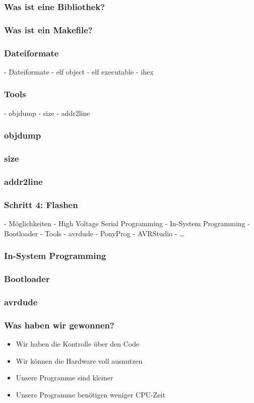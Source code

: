 \documentclass{beamer}
\begin{document}
\begin{frame}
\frametitle{Was ist eine Bibliothek?}
\end{frame}

\begin{frame}
\frametitle{Was ist ein Makefile?}
\end{frame}

\begin{frame}
\frametitle{Dateiformate}
- Dateiformate
    - elf object
    - elf executable
    - ihex
\end{frame}

\begin{frame}
\frametitle{Tools}
    - objdump
    - size
    - addr2line
\end{frame}

\begin{frame}
\frametitle{objdump}
\end{frame}

\begin{frame}
\frametitle{size}
\end{frame}

\begin{frame}
\frametitle{addr2line}
\end{frame}

\begin{frame}
\frametitle{Schritt 4: Flashen}
- Möglichkeiten
    - High Voltage Serial Programming 
    - In-System Programming
    - Bootloader
- Tools
  - avrdude
  - PonyProg
  - AVRStudio
  - …
\end{frame}

\begin{frame}
\frametitle{In-System Programming}
\end{frame}

\begin{frame}
\frametitle{Bootloader}
\end{frame}

\begin{frame}
\frametitle{avrdude}
\end{frame}

\begin{frame}
\frametitle{Was haben wir gewonnen?}
\begin{itemize}
\item Wir haben die Kontrolle über den Code
\item Wir können die Hardware voll ausnutzen
\item Unsere Programme sind kleiner
\item Unsere Programme benötigen weniger CPU-Zeit
\end{itemize}
\end{frame}
\end{document}
